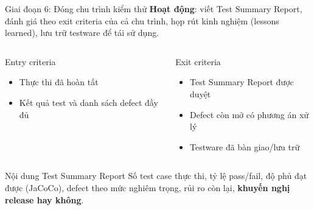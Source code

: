 \documentclass[aspectratio=169,12pt]{beamer}
\begin{document}
\begin{frame}{Giai đoạn 6: Đóng chu trình kiểm thử}
  \textbf{Hoạt động}: viết Test Summary Report, đánh giá theo exit criteria của cả
  chu trình, họp rút kinh nghiệm (lessons learned), lưu trữ testware để tái sử dụng.

  \vspace{0.4em}
  \begin{columns}[T]
    \begin{block}{Entry criteria}
      \begin{itemize}
        \item Thực thi đã hoàn tất
        \item Kết quả test và danh sách defect đầy đủ
      \end{itemize}
    \end{block}
    \begin{block}{Exit criteria}
      \begin{itemize}
        \item Test Summary Report được duyệt
        \item Defect còn mở có phương án xử lý
        \item Testware đã bàn giao/lưu trữ
      \end{itemize}
    \end{block}
  \end{columns}

  \vspace{0.3em}
  \begin{block}{Nội dung Test Summary Report}
    \small Số test case thực thi, tỷ lệ pass/fail, độ phủ đạt được (JaCoCo),
    defect theo mức nghiêm trọng, rủi ro còn lại, \textbf{khuyến nghị release hay không}.
  \end{block}
\end{frame}
\end{document}
